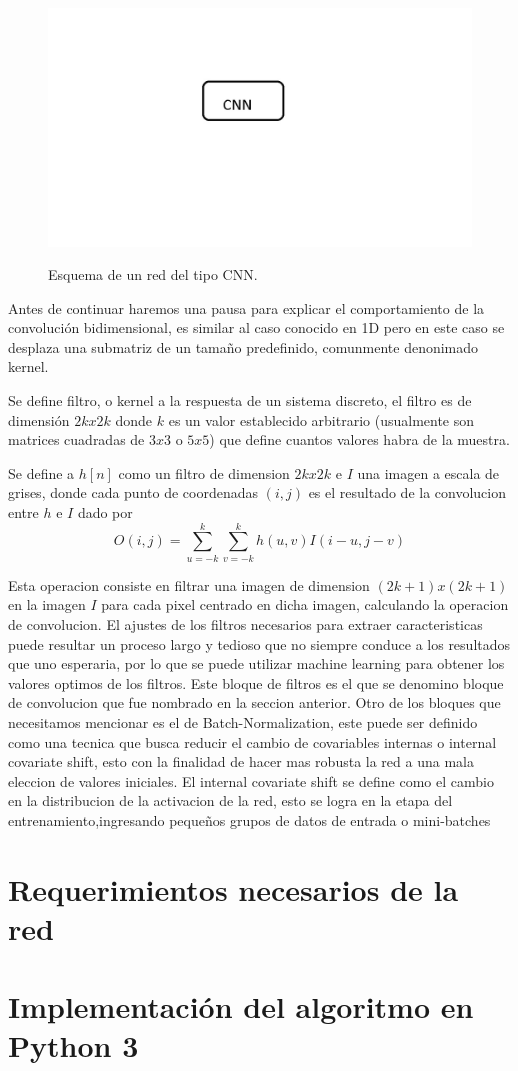 \begin{figure}
    \centering
    \includegraphics[width=1\textwidth]{imgs/CNN-completa.jpg}
    \label{fig:esquema-CNN}
    \caption{Esquema de un red del tipo CNN.}
\end{figure}
Antes de continuar haremos una pausa para explicar el comportamiento de la convolución bidimensional, es similar al caso conocido en 1D pero 
en este caso se desplaza una submatriz de un tamaño predefinido, comunmente denonimado kernel.

Se define filtro, o kernel a la respuesta de un sistema discreto, el filtro es de dimensión $2k x 2k$ donde $k$ es un 
valor establecido arbitrario (usualmente son matrices cuadradas de $3x3$ o $5x5$) que define cuantos valores habra de la muestra.

Se define a $h[n]$ como un filtro de dimension $2k x 2k$ e $I$ una imagen a escala de grises, donde cada punto de coordenadas $(i,j)$ es el 
resultado de la convolucion entre $h$ e $I$ dado por
\begin{equation}
    O(i,j)= \sum_{u=-k}^{k} \sum_{v=-k}^{k} h(u,v)I(i-u,j-v)
\end{equation}

Esta operacion consiste en filtrar una imagen de dimension $(2k+1)x(2k+1)$ en la imagen $I$ para cada pixel centrado en dicha imagen, 
calculando la operacion de convolucion.
El ajustes de los filtros necesarios para extraer caracteristicas puede resultar un proceso largo y tedioso que no siempre conduce a los 
resultados que uno esperaria, por lo que se puede utilizar machine learning para obtener los valores optimos de los filtros.
Este bloque de filtros es el que se denomino bloque de convolucion que fue nombrado en la seccion anterior.
Otro de los bloques que necesitamos mencionar es el de Batch-Normalization, este puede ser definido como una tecnica que busca 
reducir el cambio de covariables internas o internal covariate shift, esto con la finalidad de hacer mas robusta la red a una mala eleccion
de valores iniciales. El internal covariate shift se define como el cambio en la distribucion de la activacion de la red, esto se logra en la etapa
del entrenamiento,ingresando pequeños grupos de datos de entrada o mini-batches




\section{Requerimientos necesarios de la red}

\section{Implementación del algoritmo en Python 3}
